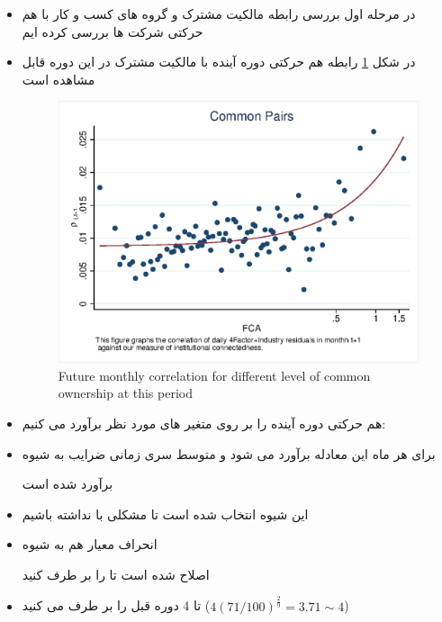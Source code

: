 \documentclass[12pt, a4paper]{article}
\begin{document}
\begin{itemize}
	\item 
	در مرحله اول بررسی رابطه مالکیت مشترک و گروه های کسب و کار با هم حرکتی شرکت ها بررسی کرده ایم
	\item 
	در شکل 
	\ref{mcorr50}
	رابطه هم حرکتی دوره آینده با مالکیت مشترک در این دوره قابل مشاهده است
	 \begin{figure}[htbp]
		\centering  
		\centering
		\includegraphics[width=0.7\linewidth]{"Output/mcorr50.eps"} 
		\caption{Future monthly correlation for different level of common ownership at this period }
		\label{mcorr50}
	\end{figure}
	\item 
	هم حرکتی دوره آینده را بر روی متغیر های مورد نظر برآورد می کنیم:
	
	
	\item
	برای هر ماه این معادله برآورد می شود و متوسط سری زمانی ضرایب به شیوه
	
	برآورد شده است
	\item
	این شیوه انتخاب شده است تا مشکلی با 
	نداشته باشیم
	\item
	انحراف معیار هم به شیوه
	
	اصلاح شده است تا 
	را بر طرف کنید
	\item
	تا 4 دوره قبل را بر طرف می کنید
	($ 4(71/100)^{\frac{2}{9}} = 3.71 \sim 4 $)
	
	
\end{itemize}
\end{document}

